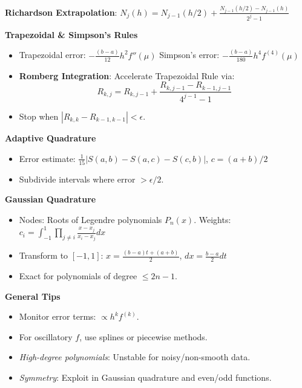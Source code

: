 \documentclass{article}
\begin{document}
\begin{minipage}[t]{0.49\textwidth}
    \textbf{Richardson Extrapolation}:  
        \( N_j(h) = N_{j-1}(h/2) + \frac{N_{j-1}(h/2)-N_{j-1}(h)}{2^{j}-1} \)

\textbf{Trapezoidal \& Simpson's Rules}
\begin{itemize}
    \item Trapezoidal error: \( -\frac{(b-a)}{12}h^2f''(\mu) \)  
    Simpson's error: \( -\frac{(b-a)}{180}h^4f^{(4)}(\mu) \)
    \item \textbf{Romberg Integration}: Accelerate Trapezoidal Rule via:
        \[ R_{k,j} = R_{k,j-1} + \frac{R_{k,j-1}-R_{k-1,j-1}}{4^{j-1}-1} \]
    \item Stop when \( |R_{k,k}-R_{k-1,k-1}| < \epsilon \).
\end{itemize}

\textbf{Adaptive Quadrature}
\begin{itemize}
    \item Error estimate: \( \frac{1}{15}|S(a,b)-S(a,c)-S(c,b)| \), \( c=(a+b)/2 \)
    \item Subdivide intervals where error \( > \epsilon/2 \).
\end{itemize}

\textbf{Gaussian Quadrature}
\begin{itemize}
    \item Nodes: Roots of Legendre polynomials \( P_n(x) \). Weights: \( c_i = \int_{-1}^1 \prod_{j\neq i}\frac{x-x_j}{x_i-x_j}dx \)
    \item Transform to \([-1,1]\): \( x = \frac{(b-a)t + (a+b)}{2} \), \( dx = \frac{b-a}{2}dt \)
    \item Exact for polynomials of degree \( \leq 2n-1 \).
\end{itemize}

\textbf{General Tips}
\begin{itemize}
    \item Monitor error terms: \( \propto h^kf^{(k)} \).  
    \item For oscillatory \( f \), use splines or piecewise methods.  
    \item \textit{High-degree polynomials}: Unstable for noisy/non-smooth data.  
    \item \textit{Symmetry}: Exploit in Gaussian quadrature and even/odd functions.
\end{itemize}


\end{minipage}
\end{document}
